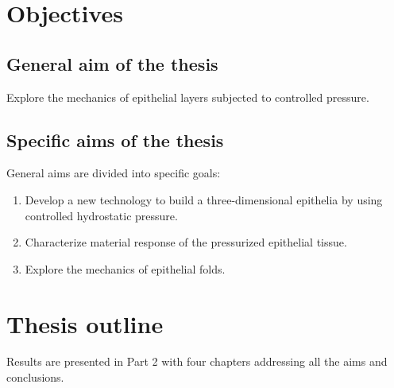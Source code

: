 \hypertarget{objectives}{%
\section{Objectives}\label{objectives}}

\subsection*{General aim of the thesis} 

Explore the mechanics of epithelial layers subjected to controlled pressure.

\subsection*{Specific aims of the thesis} 
General aims are divided into specific goals:

\begin{enumerate}
\def\labelenumi{\arabic{enumi}.}
\item  Develop a new technology to build a three-dimensional epithelia by using controlled hydrostatic pressure.
\item  Characterize material response of the pressurized epithelial tissue.
\item  Explore the mechanics of epithelial folds.
\end{enumerate}

\hypertarget{thesis-outline}{%
\section{Thesis outline}\label{thesis-outline}}

Results are presented in Part 2 with four chapters addressing all the aims and conclusions.


